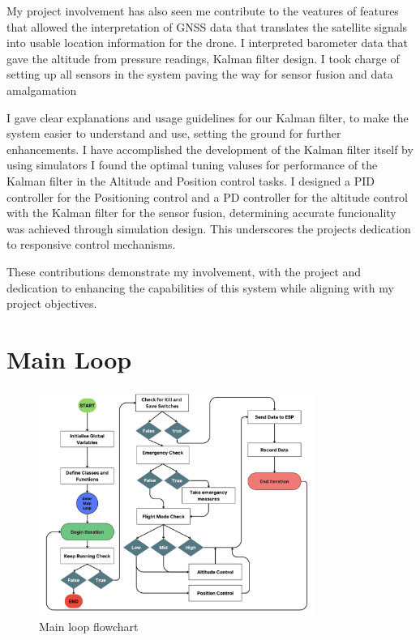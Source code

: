 \documentclass{report}
\begin{document}
My project involvement has also seen me contribute to the veatures of features
that allowed the interpretation of GNSS data that translates the satellite
signals into usable location information for the drone. I interpreted barometer
data that gave the altitude from pressure readings, Kalman filter design. I took
charge of setting up all sensors in the system paving the way for sensor fusion
and data amalgamation

I gave clear explanations and usage guidelines for our Kalman filter, to make
the system easier to understand and use, setting the ground for further
enhancements. I have accomplished the development of the Kalman filter itself by
using simulators I found the optimal tuning valuses for performance of the
Kalman filter in the Altitude and Position control tasks. I designed a PID
controller for the Positioning control and a PD controller for the altitude
control with the Kalman filter for the sensor fusion, determining accurate
funcionality was achieved through simulation design. This underscores the
projects dedication to responsive control mechanisms.

These contributions demonstrate my involvement, with the project and dedication
to enhancing the capabilities of this system while aligning with my project
objectives.

\section{Main Loop}
\begin{figure}[H]
  \centering
  \includegraphics[width=0.8\textwidth]{Pictures/main_loop_flowchart.png}
  \caption{Main loop flowchart}
  \label{fig:main_loop_flowchart}
\end{figure}
\end{document}
